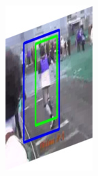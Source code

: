 \documentclass{report}
\begin{document}
\begin{figure}[h]
\begin{subfigure}{0.15\textwidth}
    \includegraphics[width=\textwidth]{output/img_3.jpg}
  \end{subfigure}
  \begin{subfigure}{0.15\textwidth}

\end{subfigure}
\end{figure}
\end{document}
